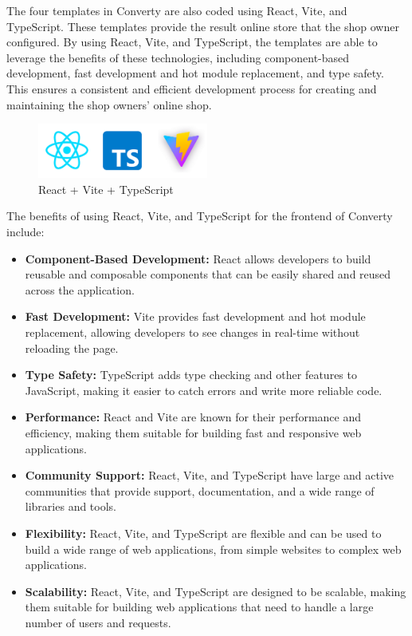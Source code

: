 The four templates in Converty are also coded using React, Vite, and TypeScript. These templates provide the result online store that the shop owner configured. By using React, Vite, and TypeScript, the templates are able to leverage the benefits of these technologies, including component-based development, fast development and hot module replacement, and type safety. This ensures a consistent and efficient development process for creating and maintaining the shop owners' online shop.

\begin{figure}[H]
    \centering
    \includegraphics[width=0.5\textwidth]{Images/reactViteTs.png}
    \caption{React + Vite + TypeScript}
    \label{fig:reactViteTypeScript}
\end{figure}

The benefits of using React, Vite, and TypeScript for the frontend of Converty include:

\begin{itemize}
    \item \textbf{Component-Based Development:} React allows developers to build reusable and composable components that can be easily shared and reused across the application.
    \item \textbf{Fast Development:} Vite provides fast development and hot module replacement, allowing developers to see changes in real-time without reloading the page.
    \item \textbf{Type Safety:} TypeScript adds type checking and other features to JavaScript, making it easier to catch errors and write more reliable code.
    \item \textbf{Performance:} React and Vite are known for their performance and efficiency, making them suitable for building fast and responsive web applications.
    \item \textbf{Community Support:} React, Vite, and TypeScript have large and active communities that provide support, documentation, and a wide range of libraries and tools.
    \item \textbf{Flexibility:} React, Vite, and TypeScript are flexible and can be used to build a wide range of web applications, from simple websites to complex web applications.
    \item \textbf{Scalability:} React, Vite, and TypeScript are designed to be scalable, making them suitable for building web applications that need to handle a large number of users and requests.
\end{itemize}

